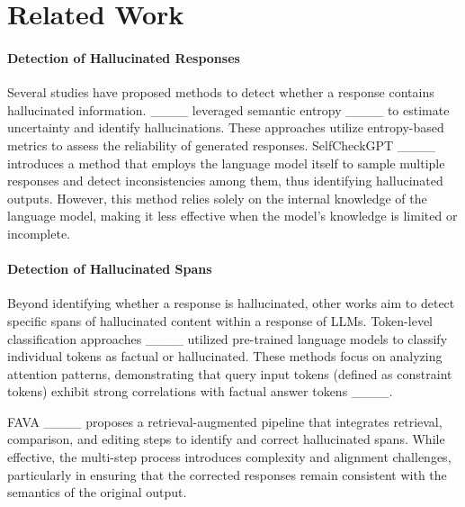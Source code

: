 \section{Related Work}
\paragraph{Detection of Hallucinated Responses} Several studies have proposed methods to detect whether a response contains hallucinated information. ____ leveraged semantic entropy ____ to estimate uncertainty and identify hallucinations. These approaches utilize entropy-based metrics to assess the reliability of generated responses.
SelfCheckGPT ____ introduces a method that employs the language model itself to sample multiple responses and detect inconsistencies among them, thus identifying hallucinated outputs. However, this method relies solely on the internal knowledge of the language model, making it less effective when the model's knowledge is limited or incomplete.

\paragraph{Detection of Hallucinated Spans} Beyond identifying whether a response is hallucinated, other works aim to detect specific spans of hallucinated content within a response of LLMs. Token-level classification approaches ____ utilized pre-trained language models to classify individual tokens as factual or hallucinated. These methods focus on analyzing attention patterns, demonstrating that query input tokens (defined as constraint tokens) exhibit strong correlations with factual answer tokens ____.

FAVA ____ proposes a retrieval-augmented pipeline that integrates retrieval, comparison, and editing steps to identify and correct hallucinated spans. While effective, the multi-step process introduces complexity and alignment challenges, particularly in ensuring that the corrected responses remain consistent with the semantics of the original output.

